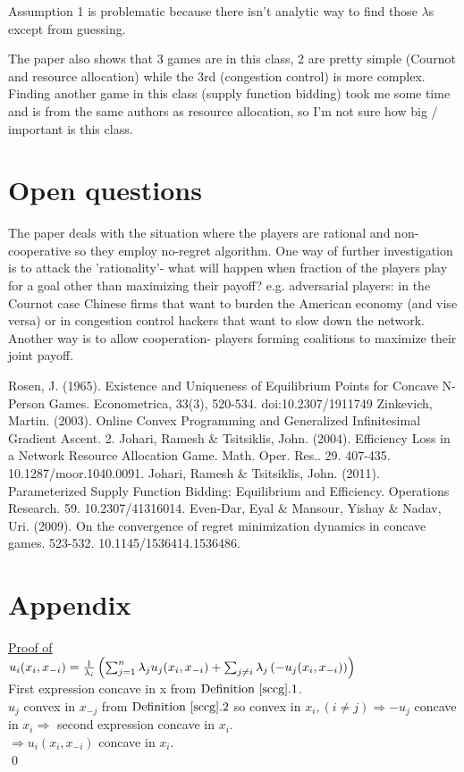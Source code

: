 \documentclass[11pt]{article}
\theoremstyle{definition}
\theoremstyle{definition}
\begin{document}
Assumption 1 is problematic because there isn't analytic way to find those $\lambda$s except from guessing.

The paper also shows that 3 games are in this class, 2 are pretty simple (Cournot and resource allocation) while the 3rd (congestion control) is more complex. Finding another game in this class (supply function bidding) took me some time and is from the same authors as resource allocation, so I'm not sure how big / important is this class.


\section{Open questions}
The paper deals with the situation where the players are rational and non-cooperative so they employ no-regret algorithm. One way of further investigation is to attack the 'rationality'- what will happen when fraction of the players play for a goal other than maximizing their payoff? e.g. adversarial players: in the Cournot case Chinese firms that want to burden the American economy (and vise versa) or in congestion control hackers that want to slow down the network.
Another way is to allow cooperation- players forming coalitions to maximize their joint payoff.


\begin{thebibliography}{9}
Rosen, J. (1965). Existence and Uniqueness of Equilibrium Points for Concave N-Person Games. Econometrica, 33(3), 520-534. doi:10.2307/1911749
Zinkevich, Martin. (2003). Online Convex Programming and Generalized Infinitesimal Gradient Ascent. 2.
Johari, Ramesh \& Tsitsiklis, John. (2004). Efficiency Loss in a Network Resource Allocation Game. Math. Oper. Res.. 29. 407-435. 10.1287/moor.1040.0091.
Johari, Ramesh \& Tsitsiklis, John. (2011). Parameterized Supply Function Bidding: Equilibrium and Efficiency. Operations Research. 59. 10.2307/41316014.
Even-Dar, Eyal \& Mansour, Yishay \& Nadav, Uri. (2009). On the convergence of regret minimization dynamics in concave games. 523-532. 10.1145/1536414.1536486.
\end{thebibliography}

\section{Appendix}

\underline{Proof of }\\
	$u_i(x_i,x_{-i}) = \frac{1}{\lambda_i} \left( \sum_{j =1}^{n} \lambda_j u_j(x_i,x_{-i}) + \sum_{j\neq i} \lambda_j \left( -u_j(x_i,x_{-i}) \right) \right)$\\
	First expression concave in x from $\defi{sccg}.1$.\\
	$u_j$ convex in $x_{-j}$ from $\defi{sccg}.2$ so convex in $x_i, (i \neq j) \Rightarrow -u_j$ concave in $x_i \Rightarrow$ second expression concave in $x_i$.\\
	$\Rightarrow u_i(x_i,x_{-i})$ concave in $x_i$.\\
	\qed
\end{document}
